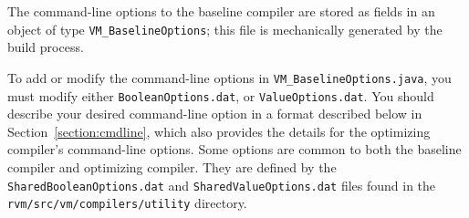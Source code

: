 The command-line options to the baseline compiler are
stored as fields in an object of type {\tt VM\_BaselineOptions}; this
file is mechanically generated by the build process. 

To add or modify the command-line options in {\tt VM\_BaselineOptions.java},
you must modify either {\tt BooleanOptions.dat}, or {\tt ValueOptions.dat}.
You should describe your desired command-line option in a format 
described below in Section~\ref{section:cmdline}, which 
also provides the details for the optimizing compiler's command-line options.
Some options are common to both the baseline compiler and optimizing
compiler. They are defined by the {\tt SharedBooleanOptions.dat} and
{\tt SharedValueOptions.dat} files found in the
{\tt rvm/src/vm/compilers/utility} directory. 
